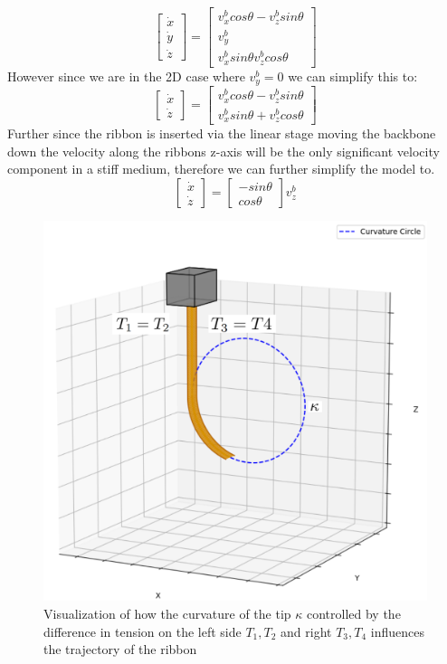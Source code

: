 \begin{equation}
    \begin{bmatrix}
        \dot{x}\\ \dot{y}\\ \dot{z}
    \end{bmatrix} = \begin{bmatrix}
        v_x^bcos \theta - v_z^b sin \theta\\
        v_y^b\\
        v_x^b sin \theta  v_z^b cos \theta
    \end{bmatrix}
\end{equation}
However since we are in the 2D case where \(v_y^b = 0\) we can simplify this to:
\begin{equation}
        \begin{bmatrix}
        \dot{x}\\ \dot{z}
    \end{bmatrix} = \begin{bmatrix}
        v_x^bcos \theta - v_z^b sin \theta\\
        v_x^b sin \theta + v_z^b cos \theta
    \end{bmatrix}
\end{equation}
Further since the ribbon is inserted via the linear stage moving the backbone down the velocity along the ribbons z-axis will be the only significant velocity component in a stiff medium, therefore we can further simplify the model to.
\begin{equation}
	\begin{bmatrix}
	\dot{x} \\ \dot{z}
	\end{bmatrix} = \begin{bmatrix}
	-sin\theta \\ cos\theta
	\end{bmatrix} v_z^b
\end{equation}

\begin{figure} [H]
    \centering
    \includegraphics[width=0.6\linewidth]{images/pythonpictures/curvature.PNG}
    \caption{Visualization of how the curvature of the tip $\kappa$ controlled by the difference in tension on the left side \(T_1, T_2\) and right \(T_3, T_4\) influences the trajectory of the ribbon}
    \label{fig:curvature}
\end{figure}


